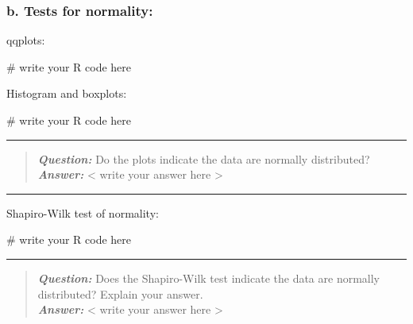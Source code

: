 \documentclass[
  10pt,
  letterpaper,
  DIV=11,
  numbers=noendperiod]{scrartcl}
\newenvironment{Shaded}{\begin{snugshade}}{\end{snugshade}}
\newcommand{\CommentTok}[1]{\textcolor[rgb]{0.37,0.37,0.37}{#1}}
\begin{document}
\hypertarget{b.-tests-for-normality}{%
\subsubsection{b. Tests for normality:}\label{b.-tests-for-normality}}

qqplots:

\begin{Shaded}
\begin{Highlighting}[]
\CommentTok{\# write your R code here}
\end{Highlighting}
\end{Shaded}

Histogram and boxplots:

\begin{Shaded}
\begin{Highlighting}[]
\CommentTok{\# write your R code here}
\end{Highlighting}
\end{Shaded}

\begin{center}\rule{0.5\linewidth}{0.5pt}\end{center}

\begin{quote}
\textbf{\emph{Question:}} Do the plots indicate the data are normally
distributed?\\
\textbf{\emph{Answer:}} \textless{} write your answer here
\textgreater{}
\end{quote}

\begin{center}\rule{0.5\linewidth}{0.5pt}\end{center}

Shapiro-Wilk test of normality:

\begin{Shaded}
\begin{Highlighting}[]
\CommentTok{\# write your R code here}
\end{Highlighting}
\end{Shaded}

\begin{center}\rule{0.5\linewidth}{0.5pt}\end{center}

\begin{quote}
\textbf{\emph{Question:}} Does the Shapiro-Wilk test indicate the data
are normally distributed? Explain your answer.\\
\textbf{\emph{Answer:}} \textless{} write your answer here
\textgreater{}
\end{quote}
\end{document}
